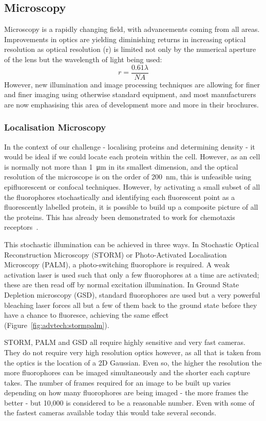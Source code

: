 \documentclass[../main.tex]{subfiles}
\begin{document}
\subsection{Microscopy}

Microscopy is a rapidly changing field, with advancements coming from all areas. Improvements in optics are yielding diminishing returns in increasing optical resolution as optical resolution (r) is limited not only by the numerical aperture of the lens but the wavelength of light being used:
\[ r = \dfrac{0.61\lambda}{NA}\]
However, new illumination and image processing techniques are allowing for finer and finer imaging using otherwise standard equipment, and most manufacturers are now emphasising this area of development more and more in their brochures.

\subsubsection{Localisation Microscopy}
In the context of our challenge - localising proteins and determining density - it would be ideal if we could locate each protein within the \ecoli cell. However, as an \ecoli cell is normally not more than \SI{1}{\micro\meter} in its smallest dimension, and the optical resolution of the microscope is on the order of \SI{200}{\nano\meter}, this is unfeasible using epifluorescent or confocal techniques. However, by activating a small subset of all the fluorophores stochastically and identifying each fluorescent point as a fluorescently labelled protein, it is possible to build up a composite picture of all the proteins. This has already been demonstrated to work for \ecoli chemotaxis receptors~\citep{greenfield09}.

This stochastic illumination can be achieved in three ways. In Stochastic Optical Reconstruction Microscopy (STORM) or Photo-Activated Localisation Microscopy (PALM), a photo-switching fluorophore is required. A weak activation laser is used such that only a few fluorophores at a time are activated; these are then read off by normal excitation illumination. In Ground State Depletion microscopy (GSD), standard fluorophores are used but a very powerful bleaching laser forces all but a few of them back to the ground state before they have a chance to fluoresce, achieving the same effect (Figure~\ref{fig:advtech:stormpalm}).

STORM, PALM and GSD all require highly sensitive and very fast cameras. They do not require very high resolution optics however, as all that is taken from the optics is the location of a 2D Gaussian. Even so, the higher the resolution the more fluorophores can be imaged simultaneously and the shorter each capture takes. The number of frames required for an image to be built up varies depending on how many fluorophores are being imaged - the more frames the better - but 10,000 is considered to be a reasonable number. Even with some of the fastest cameras available today this would take several seconds.
\end{document}
